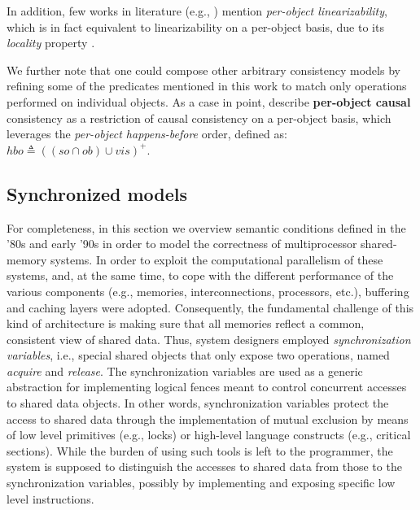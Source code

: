 \documentclass[letter, 11pt]{article}
\newcommand{\citeN}{\citet}
\renewcommand{\cite}{\citep}
\begin{document}
In addition, few works in literature (e.g., \cite{Moraru.ea:13}) mention \emph{per-object linearizability},
which is in fact equivalent to linearizability on a per-object basis,
due to its \emph{locality} property \cite{Herlihy.Wing:90}.

We further note that one could compose other arbitrary consistency models by refining some of the
predicates mentioned in this work to match only operations performed on individual objects.
As a case in point, \citeN{Burckhardt.Gotsman.ea:14} 
describe \textbf{per-object causal} consistency as a restriction of causal consistency on a per-object basis,
which leverages the \emph{per-object happens-before} order, defined as: $hbo \triangleq ((so \cap ob) \cup vis)^+$.




\subsection{Synchronized models}
\label{subsec:sync}
For completeness, in this section we overview semantic conditions defined in the '80s 
and early '90s in order to model the correctness of multiprocessor shared-memory systems.
In order to exploit the computational parallelism of these systems, and, at the 
same time, to cope with the different performance of the various components 
(e.g., memories, interconnections, processors, etc.), buffering and caching layers were adopted.
Consequently, the fundamental challenge of this kind of architecture is making sure that 
all memories reflect a common, consistent view of shared data.
Thus, system designers employed \emph{synchronization variables}, i.e.,
special shared objects that only expose two operations, named \emph{acquire} and \emph{release}.
The synchronization variables are used as a generic abstraction for implementing logical fences
meant to control concurrent accesses to shared data objects.
In other words, synchronization variables protect the access to shared data 
through the implementation of mutual exclusion by means of low level primitives 
(e.g., locks) or high-level language constructs (e.g., critical sections).
While the burden of using such tools is left to the programmer, 
the system is supposed to distinguish the accesses to shared data from those to 
the synchronization variables, possibly by implementing and exposing specific low level instructions.
\end{document}

